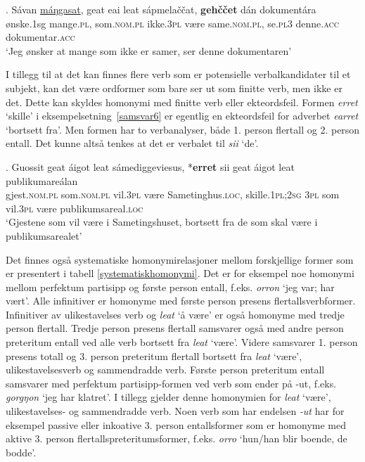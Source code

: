 \documentclass{flammie}
\begin{document}
\exg. Sávan \underline{máŋgasat}, geat eai leat sápmelaččat, \textbf{gehččet} dán dokumentára\label{samsvar5}\\
ønske\textit.{1sg} mange\textsc{.pl}, som\textsc{.nom.pl} ikke\textsc{.3pl} være same\textsc{.nom.pl}, se\textsc{.pl3} denne\textsc{.acc} dokumentar\textsc{.acc}\\
`Jeg ønsker at mange som ikke er samer, ser denne dokumentaren'

I tillegg til at det kan finnes flere verb som er potensielle verbalkandidater
til et subjekt, kan det være ordformer som bare ser ut som finitte verb, men
ikke er det. Dette kan skyldes homonymi med finitte verb eller ekteordsfeil.
Formen \textit{erret} `skille' i eksempelsetning~\ref{samsvar6} er egentlig en
ekteordsfeil for adverbet \textit{earret} `bortsett fra'. Men formen har to
verbanalyser, både 1. person flertall og 2. person entall. Det kunne altså
tenkes at det er verbalet til \textit{sii} `de'.

\exg. Guossit geat áigot leat sámediggeviesus, *\textbf{erret} sii geat áigot leat publikumareálan\label{samsvar6}\\
gjest\textsc{.nom.pl} som\textsc{.nom.pl} vil\textsc{.3pl} være Sametinghus\textsc{.loc}, skille\textsc{.1pl;2sg} \textsc{3pl} som vil\textsc{.3pl} være publikumsareal\textsc{.loc}\\
`Gjestene som vil være i Sametingshuset, bortsett fra de som skal være i publikumsarealet'

Det finnes også systematiske homonymirelasjoner mellom forskjellige former som
er presentert i tabell \ref{systematiskhomonymi}.  Det er for eksempel noe
homonymi mellom perfektum partisipp og første person entall, f.eks.
\textit{orron} `jeg var; har vært'.  Alle infinitiver er homonyme med første
person presens flertallsverbformer. Infinitiver av ulikestavelses verb og
\textit{leat} `å være' er også homonyme med tredje person flertall.  Tredje
person presens flertall samsvarer også med andre person preteritum entall ved
alle verb bortsett fra \textit{leat} `være'.  Videre samsvarer 1. person presens
totall og 3. person preteritum flertall bortsett fra \textit{leat} `være',
ulikestavelsesverb og sammendradde verb.  Første person preteritum entall
samsvarer med perfektum partisipp-formen ved verb som ender på -ut, f.eks.
\textit{gorgŋon} `jeg har klatret'.  I tillegg gjelder denne homonymien for
\textit{leat} `være', ulikestavelses- og sammendradde verb.  Noen verb som har
endelsen \textit{-ut} har for eksempel passive eller inkoative 3. person
entallsformer som er homonyme med aktive 3. person flertallspreteritumsformer,
f.eks. \textit{orro} `hun/han blir boende, de bodde'.
\end{document}
